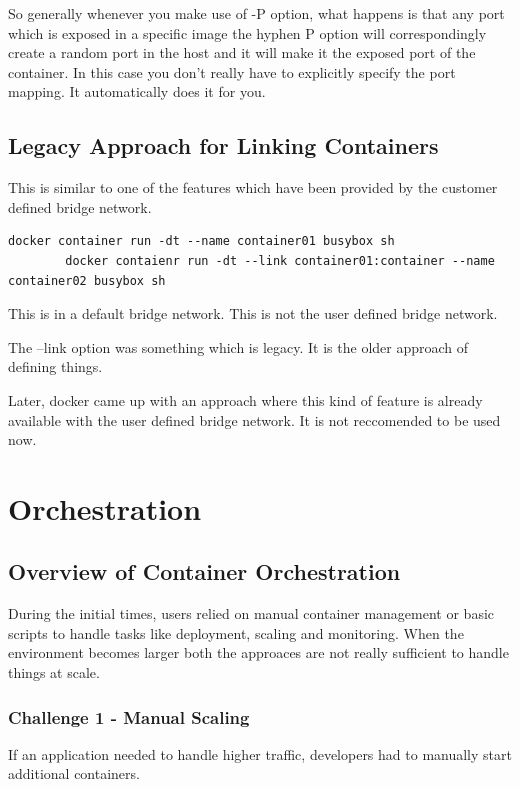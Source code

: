\documentclass[11pt]{book}
\begin{document}
    So generally whenever you make use of -P option, what happens is that any port which is exposed in a specific image
    the hyphen P option will correspondingly create a random port in the host and it will make it the exposed port of the container.
    In this case you don't really have to explicitly specify the port mapping.
    It automatically does it for you.

    \section{Legacy Approach for Linking Containers}
    This is similar to one of the features which have been provided by the customer defined bridge network.

    \begin{lstlisting}[style=terminal]
        docker container run -dt --name container01 busybox sh
        docker contaienr run -dt --link container01:container --name container02 busybox sh
    \end{lstlisting}

    This is in a default bridge network. This is not the user defined bridge network.

    The --link option was something which is legacy.
    It is the older approach of defining things.

    Later, docker came up with an approach where this kind of feature is already available with the user defined bridge network.
    It is not reccomended to be used now.

    \chapter{Orchestration}
    \section{Overview of Container Orchestration}
    During the initial times, users relied on manual container management or basic scripts to handle tasks like deployment, scaling and monitoring.
    When the environment becomes larger both the approaces are not really sufficient to handle things at scale.

    \subsection{Challenge 1 - Manual Scaling}
    If an application needed to handle higher traffic, developers had to manually start additional containers.
\end{document}
